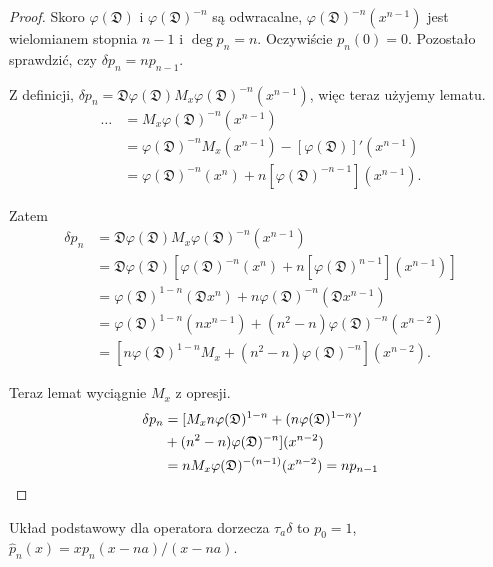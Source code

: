 \begin{proof}
	Skoro $\varphi(\mathfrak D)$ i $\varphi(\mathfrak D)^{-n}$ są odwracalne, $\varphi(\mathfrak D)^{-n}(x^{n-1})$ jest wielomianem stopnia $n - 1$ i $\deg p_n = n$.
	Oczywiście $p_n(0) = 0$.
	Pozostało sprawdzić, czy $\delta p_n = n p_{n-1}$.

	Z definicji, $\delta p_n = \mathfrak D \varphi(\mathfrak D) M_x \varphi(\mathfrak D)^{-n}(x^{n-1})$, więc teraz użyjemy lematu.
	\begin{align*}
		\ldots & = M_x \varphi(\mathfrak D) ^{-n} (x^{n-1}) \\
		& = \varphi(\mathfrak D)^{-n} M_x(x^{n-1}) - [\varphi(\mathfrak D)]' (x^{n-1}) \\
		& = \varphi(\mathfrak D)^{-n}(x^n) + n [\varphi(\mathfrak D)^{-n-1}](x^{n-1}).
	\end{align*}

	Zatem
	\begin{align*}
		\delta p_n & = \mathfrak D \varphi(\mathfrak D) M_x \varphi(\mathfrak D)^{-n} (x^{n-1}) \\
		& = \mathfrak D \varphi(\mathfrak D)[\varphi(\mathfrak D)^{-n}(x^n) + n [\varphi(\mathfrak D)^{n-1}](x^{n-1})] \\
		& = \varphi(\mathfrak D)^{1-n}(\mathfrak D x^n) + n \varphi (\mathfrak D)^{-n} (\mathfrak D x^{n-1}) \\
		& = \varphi(\mathfrak D)^{1-n} (nx^{n-1}) + (n^2-n) \varphi(\mathfrak D)^{-n} (x^{n-2}) \\
		& = [n \varphi (\mathfrak D)^{1-n} M_x + (n^2-n) \varphi(\mathfrak D)^{-n}](x^{n-2}).
	\end{align*}

	Teraz lemat wyciągnie $M_x$ z opresji.
	\begin{align*}
		\delta p_n & = [M_x n \varphi(\mathfrak D)^{1-n} + (n \varphi(\mathfrak D)^{1-n})' \\
		& + (n^2-n) \varphi(\mathfrak D)^{-n}](x^{n-2}) \\
		& = n M_x \varphi(\mathfrak D)^{-(n-1)}(x^{n-2}) = n p_{n-1} \qedhere 
	\end{align*}

\end{proof}

\begin{fakt}
	Układ podstawowy dla operatora dorzecza $\tau_a\delta$ to $p_0 = 1$, $\widehat p_n(x) = x p_n(x-na) / (x-na)$.
\end{fakt}

